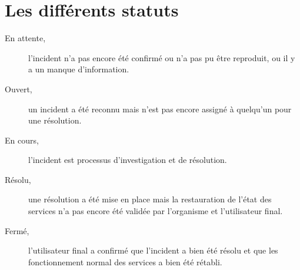 \section{Les différents statuts}
    \label{S:status}
    \begin{description}
        \item[En attente,] l'incident n'a pas encore été confirmé
            ou n'a pas pu être reproduit, 
            ou il y a un manque d'information.
        \item[Ouvert,] un incident a été reconnu mais n'est pas
            encore assigné à quelqu'un pour une résolution.
        \item[En cours,] l'incident est processus d'investigation
            et de résolution.
        \item[Résolu,] une résolution a été mise en place mais
            la restauration de l'état des services n'a pas encore
            été validée par l'organisme et l'utilisateur final.
        \item[Fermé,] l'utilisateur final a confirmé que l'incident 
            a bien été résolu et que les fonctionnement normal des 
            services a bien été rétabli.
    \end{description}
